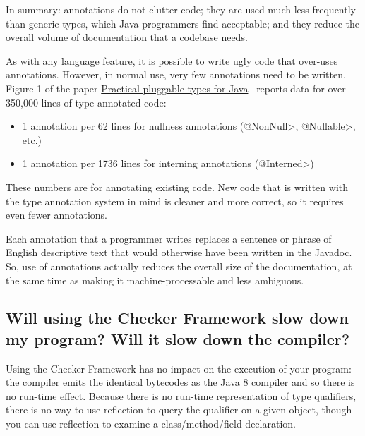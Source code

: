 
In summary:  annotations do not clutter code; they are used much
less frequently than generic types, which Java programmers find acceptable;
and they reduce the overall volume of documentation that a codebase needs.

As with any language feature, it is possible to write ugly code that
over-uses annotations.  However, in normal use, very few annotations need
to be written.  Figure 1 of the paper
\href{http://homes.cs.washington.edu/~mernst/pubs/pluggable-checkers-issta2008-abstract.html}{Practical
  pluggable types for Java}~\cite{PapiACPE2008} reports data for over
350,000 lines of type-annotated code:

\begin{itemize}
\item
    1 annotation per 62 lines for nullness annotations (\<@NonNull>, \<@Nullable>, etc.)
\item
    1 annotation per 1736 lines for interning annotations (\<@Interned>)
\end{itemize}


These numbers are for annotating existing code.  New code that
is written with the type annotation system in mind is cleaner and more
correct, so it requires even fewer annotations.

Each annotation that a programmer writes replaces a sentence or phrase of
English descriptive text that would otherwise have been written in the
Javadoc.  So, use of annotations actually reduces the overall size of the
documentation, at the same time as making it machine-processable
and less ambiguous.


\subsection{Will using the Checker Framework slow down my program?  Will it slow down the compiler?\label{faq-slowdown}}

Using the Checker Framework has no impact on the execution of your program:
the compiler emits the identical bytecodes as the Java 8
compiler and so there is no run-time effect.  Because there is no run-time
representation of type qualifiers, there is no way to use reflection to
query the qualifier on a given object, though you can use reflection to
examine a class/method/field declaration.

